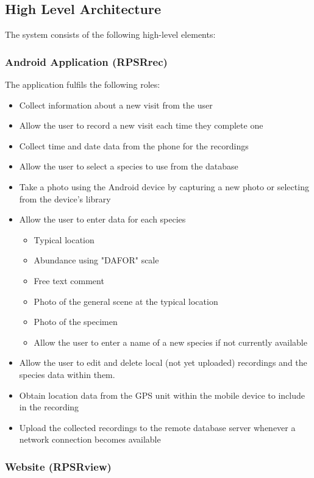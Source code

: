 \documentclass[11pt, titlepage]{article}
\begin{document}
		\subsection{High Level Architecture}
		The system consists of the following high-level elements:
			\subsubsection{Android Application (RPSRrec)}
		
			The application fulfils the following roles:
			\begin{itemize} \itemsep0pt
				\item Collect information about a new visit from the user
				\item Allow the user to record a new visit each time they complete one
				\item Collect time and date data from the phone for the recordings
				\item Allow the user to select a species to use from the database
				\item Take a photo using the Android device by capturing a new photo or selecting
                    from the device's library
				\item Allow the user to enter data for each species
				\begin{itemize}
					\item Typical location
					\item Abundance using "DAFOR" scale
					\item Free text comment
					\item Photo of the general scene at the typical location
					\item Photo of the specimen
					\item Allow the user to enter a name of a new species if not currently available
				\end{itemize}
				\item Allow the user to edit and delete local (not yet uploaded) recordings
		    		and the species data within them.
				\item Obtain location data from the GPS unit within the mobile device to include
				    in the recording
				\item Upload the collected recordings to the remote database server whenever 
		    		a network connection becomes available
		    \end{itemize}
        \clearpage
        \subsubsection{Website (RPSRview)}
            
\end{document}
